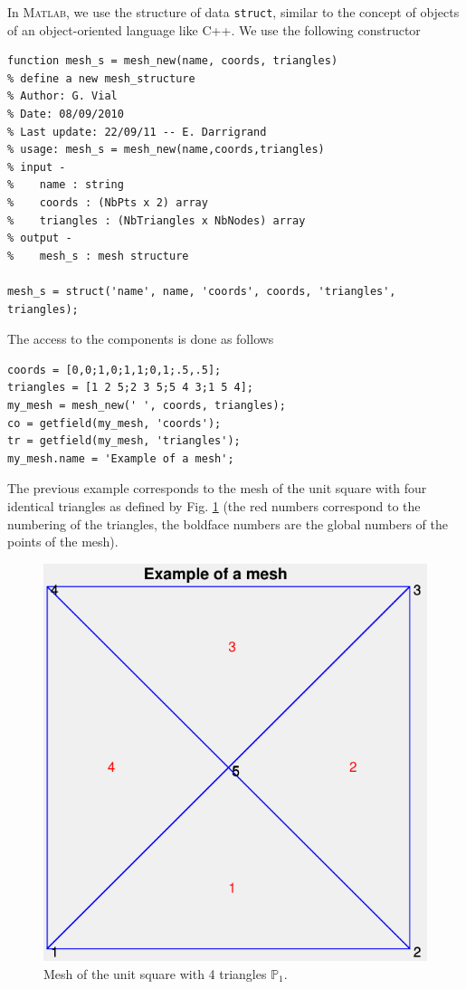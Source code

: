\documentclass[11pt,a4paper,center,notitlepage]{article}
\numberwithin{equation}{section}
\begin{document}
In \textsc{Matlab}, we use the structure of data \texttt{struct}, similar to the concept of objects of an object-oriented language like C++. We use the following constructor
\begin{verbatim}
function mesh_s = mesh_new(name, coords, triangles)
% define a new mesh_structure
% Author: G. Vial
% Date: 08/09/2010
% Last update: 22/09/11 -- E. Darrigrand
% usage: mesh_s = mesh_new(name,coords,triangles)
% input -
%    name : string
%    coords : (NbPts x 2) array
%    triangles : (NbTriangles x NbNodes) array
% output -
%    mesh_s : mesh structure

mesh_s = struct('name', name, 'coords', coords, 'triangles', triangles);
\end{verbatim}
The access to the components is done as follows
\begin{verbatim}
coords = [0,0;1,0;1,1;0,1;.5,.5];
triangles = [1 2 5;2 3 5;5 4 3;1 5 4];
my_mesh = mesh_new(' ', coords, triangles);
co = getfield(my_mesh, 'coords');
tr = getfield(my_mesh, 'triangles');
my_mesh.name = 'Example of a mesh';
\end{verbatim}
The previous example corresponds to the mesh of the unit square with four identical triangles as defined by Fig. \ref{fig1} (the red numbers correspond to the numbering of the triangles, the boldface numbers are the global numbers of the points of the mesh).
\begin{figure}[H]
\centering
\includegraphics[scale=0.6]{1}
\caption{Mesh of the unit square with 4 triangles $\mathbb{P}_1$.}
\label{fig1}
\end{figure}
\end{document}
